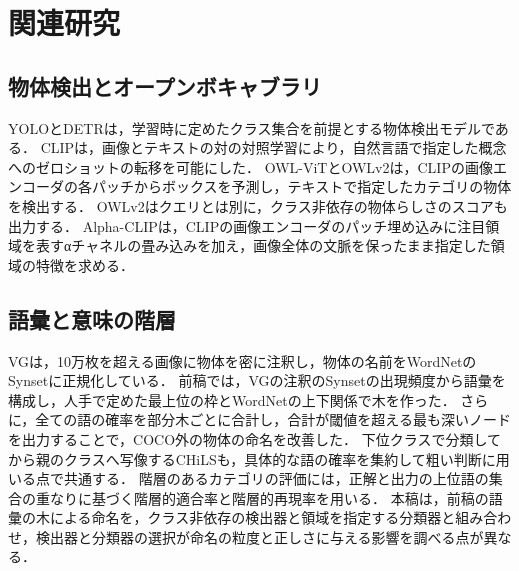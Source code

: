 \section{関連研究}
\subsection{物体検出とオープンボキャブラリ}
YOLO\cite{ref_YOLO}とDETR\cite{ref_DETR}は，学習時に定めたクラス集合を前提とする物体検出モデルである．
CLIP\cite{ref_CLIP}は，画像とテキストの対の対照学習により，自然言語で指定した概念へのゼロショットの転移を可能にした．
OWL-ViT\cite{ref_OWLViT}とOWLv2\cite{ref_OWLv2}は，CLIPの画像エンコーダの各パッチからボックスを予測し，テキストで指定したカテゴリの物体を検出する．
OWLv2はクエリとは別に，クラス非依存の物体らしさのスコアも出力する．
Alpha-CLIP\cite{ref_AlphaCLIP}は，CLIPの画像エンコーダのパッチ埋め込みに注目領域を表すαチャネルの畳み込みを加え，画像全体の文脈を保ったまま指定した領域の特徴を求める．

\subsection{語彙と意味の階層}
VG\cite{ref_VG}は，10万枚を超える画像に物体を密に注釈し，物体の名前をWordNetのSynsetに正規化している．
前稿\cite{ref_prevVG}では，VGの注釈のSynsetの出現頻度から語彙を構成し，人手で定めた最上位の枠とWordNetの上下関係で木を作った．
さらに，全ての語の確率を部分木ごとに合計し，合計が閾値を超える最も深いノードを出力することで，COCO外の物体の命名を改善した．
下位クラスで分類してから親のクラスへ写像するCHiLS\cite{ref_CHiLS}も，具体的な語の確率を集約して粗い判断に用いる点で共通する．
階層のあるカテゴリの評価には，正解と出力の上位語の集合の重なりに基づく階層的適合率と階層的再現率\cite{ref_hier}を用いる．
本稿は，前稿の語彙の木による命名を，クラス非依存の検出器と領域を指定する分類器と組み合わせ，検出器と分類器の選択が命名の粒度と正しさに与える影響を調べる点が異なる．
